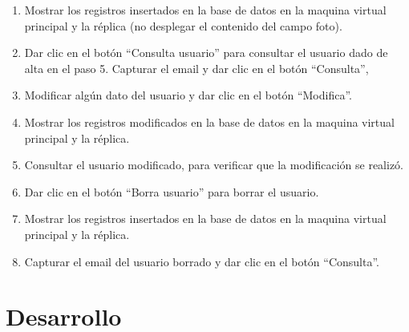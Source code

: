 \documentclass[11pt]{article}
\begin{document}
\begin{enumerate}
\begin{enumerate}
					\item Mostrar los registros insertados en la base de datos en la maquina virtual principal y la réplica (no desplegar el contenido del campo foto).
					\item Dar clic en el botón ``Consulta usuario'' para consultar el usuario dado de alta en el paso 5.  Capturar el email y dar clic en el botón ``Consulta'',
					\item Modificar algún dato del usuario y dar clic en el botón ``Modifica''.
					\item Mostrar los registros modificados en la base de datos en la maquina virtual principal y la réplica.
					\item Consultar el usuario modificado, para verificar que la modificación se realizó.
					\item Dar clic en el botón ``Borra usuario'' para borrar el usuario.
					\item Mostrar los registros insertados en la base de datos en la maquina virtual principal y la réplica.
					\item Capturar el email del usuario borrado y dar clic en el botón ``Consulta''.
				\end{enumerate}			
		\end{enumerate}
		
	\section{Desarrollo}
\end{document}
